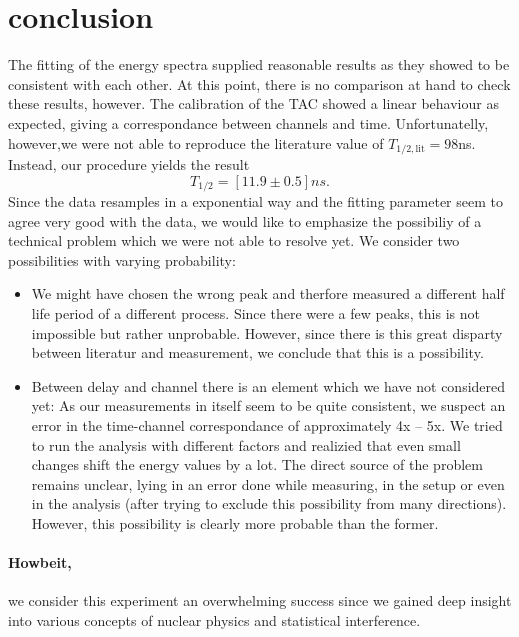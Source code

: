 \section{conclusion}
The fitting of the energy spectra supplied reasonable results as they showed to be consistent 
with each other. At this point, there is no comparison at hand to check these results, however. 
The calibration of the TAC showed a linear behaviour as expected, giving
a correspondance between channels and time. 
Unfortunatelly, however,we were not able to reproduce the literature value of 
$T_{1/2, \mathrm{lit}}=98$ns. Instead, our procedure yields the result
\begin{equation}
T_{1/2} =\left [11.9 \pm 0.5 \right ] ns .
\end{equation}
Since the data resamples in a exponential way and the fitting parameter seem to agree very good with the data,
we would like to emphasize the possibiliy of a technical problem which we were not able to resolve yet. 
We consider two possibilities with varying probability:
\begin{itemize}
    \item 
        We might have chosen the wrong peak and therfore measured a different half life period of a different 
        process. Since there were a few peaks, this is not impossible but rather unprobable. However, since there
        is this great disparty between literatur and measurement, we conclude that this is a possibility.
    \item 
        Between delay and channel there is an element which we have not considered yet:  
        As our measurements in itself seem to be quite consistent, we suspect an error in the 
        time-channel correspondance of approximately 4x -- 5x. 
        We tried to run the analysis with different factors and realizied that even small changes
        shift the energy values by a lot. 
        The direct source of the problem remains unclear, lying in an error done 
        while measuring, in the setup or even in the analysis (after trying to exclude this 
            possibility from many directions).
        However, this possibility is clearly more probable than the former. 
\end{itemize}
\paragraph{Howbeit,} we consider this experiment an overwhelming success since we gained deep 
insight into various concepts of nuclear physics and statistical interference. 
